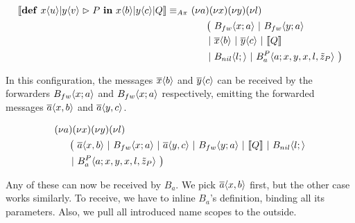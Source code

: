 \begin{align*}
  \encMJtoAP{\jdef{\jrct{\jrcv{x}{u} \jpat \jrcv{y}{v}}{P}}{\jsnd{x}{b} \jpar \jsnd{y}{c} \jpar Q}}
  \astructequ\ &\anew{a}{\anew{x}{\anew{y}{\anew{l}{ \\
      &\hspace{0.5cm}
      \begin{aligned}[t]
        \big(\ &\ains{B_{fw}}{x}{a}
        \apar   \ains{B_{fw}}{y}{a} \\
        \apar  &\asnd{x}{b} \apar \asnd{y}{c} \apar \encMJtoAP{Q} \\
        \apar  &\ains{B_{nil}}{l}{}
        \apar   \ains{B_a^P}{a}{x, y, x, l, \tilde{z}_P}
        \ \big)
      \end{aligned}
    }}}}
\end{align*}

In this configuration,
the messages $\overline{x}\langle b\rangle$ and $\overline{y}\langle c\rangle$ can be received by the forwarders
$B_{fw} \langle x ; a \rangle$ and $B_{fw} \langle x ; a \rangle$ respectively,
emitting the forwarded messages $\overline{a}\langle x,b\rangle$ and $\overline{a}\langle y,c\rangle$.

\begin{align*}
  &\anew{a}{\anew{x}{\anew{y}{\anew{l}{ \\
    &\hspace{0.5cm}
    \begin{aligned}[t]
      \big(\ &\asnd{a}{x,b}
      \apar   \ains{B_{fw}}{x}{a}
      \apar   \asnd{a}{y,c}
      \apar   \ains{B_{fw}}{y}{a}
      \apar   \encMJtoAP{Q}
      \apar   \ains{B_{nil}}{l}{} \\
      \apar  &\ains{B_a^P}{a}{x, y, x, l, \tilde{z}_P}
      \ \big)
    \end{aligned}
  }}}}
\end{align*}

Any of these can now be received by $B_a$. We pick $\overline{a}\langle x,b\rangle$ first,
but the other case works similarly.
To receive, we have to inline $B_a$'s definition, binding all its parameters.
Also, we pull all introduced name scopes to the outside.

